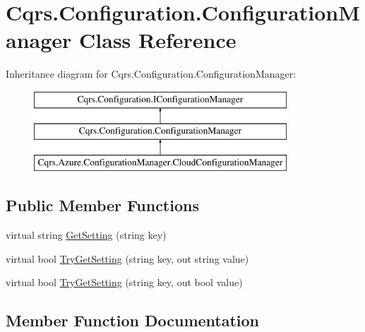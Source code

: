 \hypertarget{classCqrs_1_1Configuration_1_1ConfigurationManager}{}\section{Cqrs.\+Configuration.\+Configuration\+Manager Class Reference}
\label{classCqrs_1_1Configuration_1_1ConfigurationManager}
Inheritance diagram for Cqrs.\+Configuration.\+Configuration\+Manager\+:\begin{figure}[H]
\begin{center}
\leavevmode
\includegraphics[height=3.000000cm]{classCqrs_1_1Configuration_1_1ConfigurationManager}
\end{center}
\end{figure}
\subsection*{Public Member Functions}
\begin{DoxyCompactItemize}
\item 
virtual string \hyperlink{classCqrs_1_1Configuration_1_1ConfigurationManager_ac3e31af665b95b781fee23f577170a63}{Get\+Setting} (string key)
\item 
virtual bool \hyperlink{classCqrs_1_1Configuration_1_1ConfigurationManager_ad87af2a011af065d6d3e0d2ff01c7f6e}{Try\+Get\+Setting} (string key, out string value)
\item 
virtual bool \hyperlink{classCqrs_1_1Configuration_1_1ConfigurationManager_a40810d0b9fd2f3d1c4a270681e908c84}{Try\+Get\+Setting} (string key, out bool value)
\end{DoxyCompactItemize}


\subsection{Member Function Documentation}
\mbox{\label{classCqrs_1_1Configuration_1_1ConfigurationManager_ac3e31af665b95b781fee23f577170a63}} 
